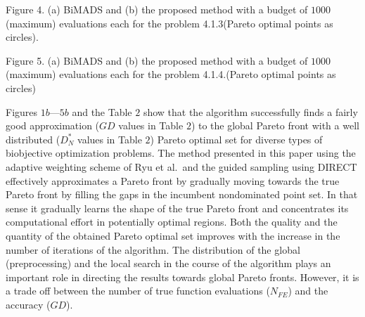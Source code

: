 \topinsert
\vbox{
{\rmIX Figure 4. (a) BiMADS and (b) the proposed method with a budget of $1000$ 
(maximum) evaluations each for the problem 4.1.3(Pareto optimal 
points as circles).}
}
\endinsert

\topinsert
\vbox{
{\rmIX Figure 5. (a) BiMADS and (b) the proposed method with a budget of 
$1000$  (maximum) evaluations each for the problem 4.1.4.(Pareto optimal 
points as circles)}
}
\endinsert

Figures $1b$---$5b$  and the Table $2$ show that the algorithm successfully 
finds a fairly good approximation ($GD$ values in Table $2$) to the 
global Pareto front with a well distributed ($D^*_N$ values in Table $2$) 
Pareto optimal set for diverse types of biobjective optimization problems. 
The  method presented in this paper using the adaptive weighting scheme of 
Ryu et al.\RKW\ and the guided sampling using DIRECT effectively approximates a 
Pareto front by gradually moving towards the true Pareto front by filling the 
gaps in the incumbent nondominated point set. In that sense it gradually learns 
the shape of the true Pareto front and concentrates its computational effort in 
potentially optimal regions. Both the quality and the quantity of the obtained 
Pareto optimal set improves with the increase in the number of iterations of 
the algorithm. The distribution of the global (preprocessing) and the 
local search in the course of the algorithm plays an important role in 
directing the results towards global Pareto fronts. However, it is a trade off 
between the number of true function evaluations ($N_{FE}$) and the accuracy 
($GD$). 

\topinsert
{}
\endinsert

